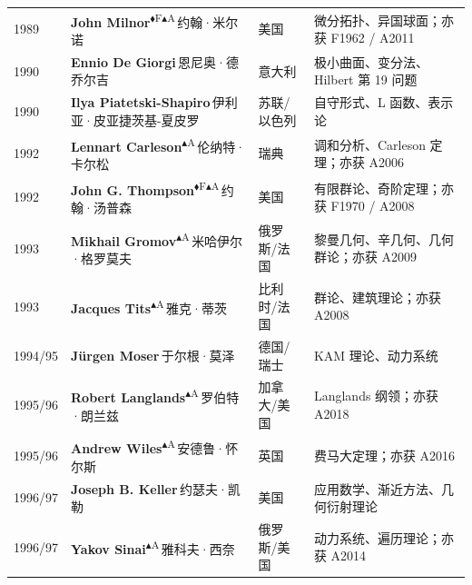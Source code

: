 \documentclass[a4paper,10pt]{article}
\newcommand{\Fbadge}{\textsuperscript{\normalfont\scriptsize\sffamily\color{fieldsclr}$\blacklozenge$F}}
\newcommand{\Abadge}{\textsuperscript{\normalfont\scriptsize\sffamily\color{abelclr}$\blacktriangle$A}}
\begin{document}
\begin{longtable}{
  >{\raggedright}m{1.8cm}
  >{\raggedright}m{7.0cm}
  >{\raggedright}m{4.2cm}
  >{\raggedright\arraybackslash}m{9.5cm}
}
{\color{yearcolor}1989} & {\bfseries John Milnor}\Fbadge\Abadge\,{\small\color{mutedgray}约翰·米尔诺} & 美国 & {\small\color{fieldcolor}微分拓扑、异国球面；亦获 F1962 / A2011} \\[2pt]
{\color{yearcolor}1990} & {\bfseries Ennio De Giorgi}\,{\small\color{mutedgray}恩尼奥·德乔尔吉} & 意大利 & {\small\color{fieldcolor}极小曲面、变分法、Hilbert 第 19 问题} \\[2pt]
{\color{yearcolor}1990} & {\bfseries Ilya Piatetski-Shapiro}\,{\small\color{mutedgray}伊利亚·皮亚捷茨基-夏皮罗} & 苏联/以色列 & {\small\color{fieldcolor}自守形式、L 函数、表示论} \\[2pt]
{\color{yearcolor}1992} & {\bfseries Lennart Carleson}\Abadge\,{\small\color{mutedgray}伦纳特·卡尔松} & 瑞典 & {\small\color{fieldcolor}调和分析、Carleson 定理；亦获 A2006} \\[2pt]
{\color{yearcolor}1992} & {\bfseries John G. Thompson}\Fbadge\Abadge\,{\small\color{mutedgray}约翰·汤普森} & 美国 & {\small\color{fieldcolor}有限群论、奇阶定理；亦获 F1970 / A2008} \\[2pt]
{\color{yearcolor}1993} & {\bfseries Mikhail Gromov}\Abadge\,{\small\color{mutedgray}米哈伊尔·格罗莫夫} & 俄罗斯/法国 & {\small\color{fieldcolor}黎曼几何、辛几何、几何群论；亦获 A2009} \\[2pt]
{\color{yearcolor}1993} & {\bfseries Jacques Tits}\Abadge\,{\small\color{mutedgray}雅克·蒂茨} & 比利时/法国 & {\small\color{fieldcolor}群论、建筑理论；亦获 A2008} \\[2pt]
{\color{yearcolor}1994/95} & {\bfseries Jürgen Moser}\,{\small\color{mutedgray}于尔根·莫泽} & 德国/瑞士 & {\small\color{fieldcolor}KAM 理论、动力系统} \\[2pt]
{\color{yearcolor}1995/96} & {\bfseries Robert Langlands}\Abadge\,{\small\color{mutedgray}罗伯特·朗兰兹} & 加拿大/美国 & {\small\color{fieldcolor}Langlands 纲领；亦获 A2018} \\[2pt]
{\color{yearcolor}1995/96} & {\bfseries Andrew Wiles}\Abadge\,{\small\color{mutedgray}安德鲁·怀尔斯} & 英国 & {\small\color{fieldcolor}费马大定理；亦获 A2016} \\[2pt]
{\color{yearcolor}1996/97} & {\bfseries Joseph B. Keller}\,{\small\color{mutedgray}约瑟夫·凯勒} & 美国 & {\small\color{fieldcolor}应用数学、渐近方法、几何衍射理论} \\[2pt]
{\color{yearcolor}1996/97} & {\bfseries Yakov Sinai}\Abadge\,{\small\color{mutedgray}雅科夫·西奈} & 俄罗斯/美国 & {\small\color{fieldcolor}动力系统、遍历理论；亦获 A2014} \\[2pt]

\end{longtable}
\end{document}
